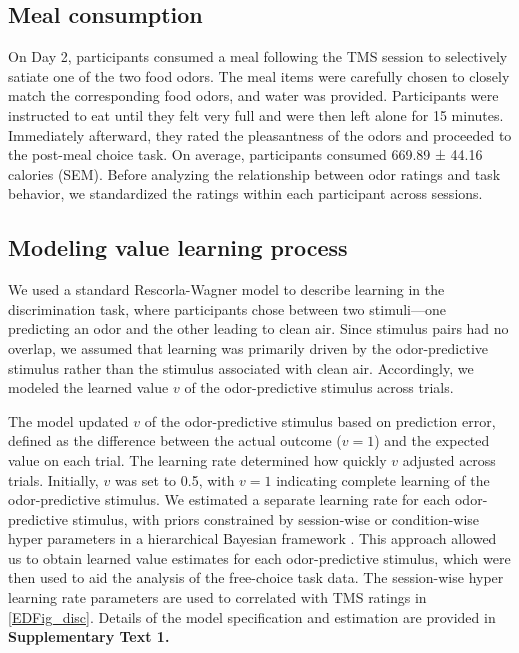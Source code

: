 \documentclass[lineno,sn-basic]{sn-jnl}%
\begin{document}
\subsection{Meal consumption} 
\label{meal-consumption}

On Day 2, participants consumed a meal following the TMS session to selectively satiate one of the two food odors. The meal items were carefully chosen to closely match the corresponding food odors, and water was provided. Participants were instructed to eat until they
felt very full and were then left alone for 15 minutes. Immediately afterward, they rated the pleasantness of the odors and
proceeded to the post-meal choice task. On average, participants consumed 669.89 ± 44.16 calories (SEM). Before analyzing the relationship between odor ratings and task behavior, we standardized the ratings within each participant across sessions. 


\subsection{Modeling value learning process} 
\label{modeling-value-learning}

We used a standard Rescorla-Wagner model \citep{RN520} to describe learning in the discrimination task, where participants chose between two stimuli—one predicting an odor and the other leading to clean air. Since stimulus pairs had no overlap, we assumed that learning was primarily driven by the odor-predictive stimulus rather than the stimulus associated with clean air. Accordingly, we modeled the learned value $v$ of the odor-predictive stimulus across trials.

The model updated $v$ of the odor-predictive stimulus based on prediction error, defined as the difference between the actual outcome ($v=1$) and the expected value on each trial. The learning rate determined how quickly $v$ adjusted across trials. Initially, $v$ was set to 0.5, with $v=1$ indicating complete learning of the odor-predictive stimulus. We estimated a separate learning rate for each odor-predictive stimulus, with priors constrained by session-wise or condition-wise hyper parameters in a hierarchical Bayesian framework \citep{RN630}. This approach allowed us to obtain learned value estimates for each odor-predictive stimulus, which were then used to aid the analysis of the free-choice task data. 
The session-wise hyper learning rate parameters are used to correlated with TMS ratings in \ref{EDFig_disc}. Details of the model specification and estimation are provided in \textbf{Supplementary Text 1.}
\end{document}
